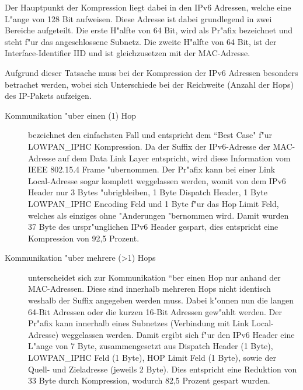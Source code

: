 \documentclass[final]{lktseminar}
\begin{document}
Der Hauptpunkt der Kompression liegt dabei in den IPv6 Adressen\cite{rfc4291}, welche eine L"ange von 128 Bit aufweisen. Diese
Adresse ist dabei grundlegend in zwei Bereiche aufgeteilt. Die erste H"alfte von 64 Bit, wird als Pr"afix bezeichnet und
steht f"ur das angeschlossene Subnetz. Die zweite H"alfte von 64 Bit, ist der Interface-Identifier IID und ist
gleichzusetzen mit der MAC-Adresse.

Aufgrund dieser Tatsache muss bei der Kompression der IPv6 Adressen besonders betrachet werden, wobei sich Unterschiede
bei der Reichweite (Anzahl der Hops) des IP-Pakets aufzeigen.

\begin{description}
    \item[Kommunikation "uber einen (1) Hop] bezeichnet den einfachsten Fall und entspricht dem ``Best Case" f"ur
    LOWPAN\_IPHC Kompression. Da der Suffix der IPv6-Adresse der MAC-Adresse auf dem Data Link Layer entspricht, wird
    diese Information vom IEEE 802.15.4 Frame "ubernommen. Der Pr"afix kann bei einer Link Local-Adresse sogar komplett
    weggelassen werden, womit von dem IPv6 Header nur 3 Bytes "ubrigbleiben, 1 Byte Dispatch Header, 1 Byte LOWPAN\_IPHC Encoding Feld
    und 1 Byte f"ur das Hop Limit Feld, welches als einziges ohne "Anderungen "bernommen wird. Damit wurden 37 Byte des
    urspr"unglichen IPv6 Header gespart, dies entspricht eine Kompression von 92,5 Prozent.

    \item[Kommunikation "uber mehrere (\textgreater 1) Hops] unterscheidet sich zur Kommunikation ``ber einen Hop nur anhand der MAC-Adressen.
    Diese sind innerhalb mehreren Hops nicht identisch weshalb der Suffix angegeben werden muss. Dabei k"onnen nun die langen 64-Bit Adressen oder die
    kurzen 16-Bit Adressen gew"ahlt werden. Der Pr"afix kann innerhalb eines Subnetzes (Verbindung mit Link Local-Adresse) weggelassen werden.
    Damit ergibt sich f"ur den IPv6 Header eine L"ange von 7 Byte, zusammengesetzt aus Dispatch Header (1 Byte), LOWPAN\_IPHC Feld (1 Byte),
    HOP Limit Feld (1 Byte), sowie der Quell- und Zieladresse (jeweils 2 Byte). Dies entspricht eine Reduktion von 33 Byte durch
    Kompression, wodurch 82,5 Prozent gespart wurden.
\end{description}
\end{document}
